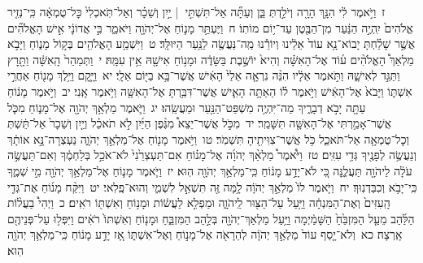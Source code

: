 \documentclass[18pt]{article}
\newcommand{\kri}[1]{\Afootnote{#1}}	%
\begin{document}
 {\loc ז~}וַיֹּ֣אמֶר לִ֔י הִנָּ֥ךְ הָרָ֖ה וְיֹלַ֣דְתְּ בֵּ֑ן וְעַתָּ֞ה אַל־תִּשְׁתִּ֣י  |  יַ֣יִן וְשֵׁכָ֗ר וְאַל־תֹּֽאכְלִי֙ כׇּל־טֻמְאָ֔ה כִּֽי־נְזִ֤יר אֱלֹהִים֙ יִֽהְיֶ֣ה הַנַּ֔עַר מִן־הַבֶּ֖טֶן עַד־י֥וֹם מוֹתֽוֹ׃ \startlock
 {\loc ח~}וַיֶּעְתַּ֥ר מָנ֛וֹחַ אֶל־יְהֹוָ֖ה וַיֹּאמַ֑ר בִּ֣י אֲדוֹנָ֔י אִ֣ישׁ הָאֱלֹהִ֞ים אֲשֶׁ֣ר שָׁלַ֗חְתָּ יָבוֹא־נָ֥א עוֹד֙ אֵלֵ֔ינוּ וְיוֹרֵ֕נוּ מַֽה־נַּעֲשֶׂ֖ה לַנַּ֥עַר הַיּוּלָּֽד׃ \startlock
 {\loc ט~}וַיִּשְׁמַ֥ע הָאֱלֹהִ֖ים בְּק֣וֹל מָנ֑וֹחַ וַיָּבֹ֣א מַלְאַךְ֩ הָאֱלֹהִ֨ים ע֜וֹד אֶל־הָאִשָּׁ֗ה וְהִיא֙ יוֹשֶׁ֣בֶת בַּשָּׂדֶ֔ה וּמָנ֥וֹחַ אִישָׁ֖הּ אֵ֥ין עִמָּֽהּ׃ \startlock
 {\loc י~}וַתְּמַהֵר֙ הָֽאִשָּׁ֔ה וַתָּ֖רׇץ וַתַּגֵּ֣ד לְאִישָׁ֑הּ וַתֹּ֣אמֶר אֵלָ֔יו הִנֵּ֨ה נִרְאָ֤ה אֵלַי֙ הָאִ֔ישׁ אֲשֶׁר־בָּ֥א בַיּ֖וֹם אֵלָֽי׃ \startlock
 {\loc יא~}וַיָּ֛קׇם וַיֵּ֥לֶךְ מָנ֖וֹחַ אַחֲרֵ֣י אִשְׁתּ֑וֹ וַיָּבֹא֙ אֶל־הָאִ֔ישׁ וַיֹּ֣אמֶר ל֗וֹ הַאַתָּ֥ה הָאִ֛ישׁ אֲשֶׁר־דִּבַּ֥רְתָּ אֶל־הָאִשָּׁ֖ה וַיֹּ֥אמֶר אָֽנִי׃ \startlock
 {\loc יב~}וַיֹּ֣אמֶר מָנ֔וֹחַ עַתָּ֖ה יָבֹ֣א דְבָרֶ֑יךָ מַה־יִּהְיֶ֥ה מִשְׁפַּט־הַנַּ֖עַר וּמַעֲשֵֽׂהוּ׃ \startlock
 {\loc יג~}וַיֹּ֛אמֶר מַלְאַ֥ךְ יְהֹוָ֖ה אֶל־מָנ֑וֹחַ מִכֹּ֛ל אֲשֶׁר־אָמַ֥רְתִּי אֶל־הָאִשָּׁ֖ה תִּשָּׁמֵֽר׃ \startlock
 {\loc יד~}מִכֹּ֣ל אֲשֶׁר־יֵצֵא֩ מִגֶּ֨פֶן הַיַּ֜יִן לֹ֣א תֹאכַ֗ל וְיַ֤יִן וְשֵׁכָר֙ אַל־תֵּ֔שְׁתְּ וְכׇל־טֻמְאָ֖ה אַל־תֹּאכַ֑ל כֹּ֥ל אֲשֶׁר־צִוִּיתִ֖יהָ תִּשְׁמֹֽר׃ \startlock
 {\loc טו~}וַיֹּ֥אמֶר מָנ֖וֹחַ אֶל־מַלְאַ֣ךְ יְהֹוָ֑ה נַעְצְרָה־נָּ֣א אוֹתָ֔ךְ וְנַעֲשֶׂ֥ה לְפָנֶ֖יךָ גְּדִ֥י עִזִּֽים׃ \startlock
 {\loc טז~}וַיֹּ֩אמֶר֩ מַלְאַ֨ךְ יְהֹוָ֜ה אֶל־מָנ֗וֹחַ אִם־תַּעְצְרֵ֙נִי֙ לֹא־אֹכַ֣ל בְּלַחְמֶ֔ךָ וְאִם־תַּעֲשֶׂ֣ה עֹלָ֔ה לַיהֹוָ֖ה תַּעֲלֶ֑נָּה כִּ֚י לֹא־יָדַ֣ע מָנ֔וֹחַ כִּֽי־מַלְאַ֥ךְ יְהֹוָ֖ה הֽוּא׃ \startlock
 {\loc יז~}וַיֹּ֧אמֶר מָנ֛וֹחַ אֶל־מַלְאַ֥ךְ יְהֹוָ֖ה מִ֣י שְׁמֶ֑ךָ כִּֽי־יָבֹ֥א  \edtext{(דבריך)}{\kri{קרי: דְבָרְךָ֖}}  וְכִבַּדְנֽוּךָ׃ \startlock
 {\loc יח~}וַיֹּ֤אמֶר לוֹ֙ מַלְאַ֣ךְ יְהֹוָ֔ה לָ֥מָּה זֶּ֖ה תִּשְׁאַ֣ל לִשְׁמִ֑י וְהוּא־פֶֽלִאי׃ \startlock
 {\loc יט~}וַיִּקַּ֨ח מָנ֜וֹחַ אֶת־גְּדִ֤י הָֽעִזִּים֙ וְאֶת־הַמִּנְחָ֔ה וַיַּ֥עַל עַל־הַצּ֖וּר לַֽיהֹוָ֑ה וּמַפְלִ֣א לַעֲשׂ֔וֹת וּמָנ֥וֹחַ וְאִשְׁתּ֖וֹ רֹאִֽים׃ \startlock
 {\loc כ~}וַיְהִי֩ בַעֲל֨וֹת הַלַּ֜הַב מֵעַ֤ל הַמִּזְבֵּ֙חַ֙ הַשָּׁמַ֔יְמָה וַיַּ֥עַל מַלְאַךְ־יְהֹוָ֖ה בְּלַ֣הַב הַמִּזְבֵּ֑חַ וּמָנ֤וֹחַ וְאִשְׁתּוֹ֙ רֹאִ֔ים וַיִּפְּל֥וּ עַל־פְּנֵיהֶ֖ם אָֽרְצָה׃ \startlock
 {\loc כא~}וְלֹא־יָ֤סַף עוֹד֙ מַלְאַ֣ךְ יְהֹוָ֔ה לְהֵרָאֹ֖ה אֶל־מָנ֣וֹחַ וְאֶל־אִשְׁתּ֑וֹ אָ֚ז יָדַ֣ע מָנ֔וֹחַ כִּֽי־מַלְאַ֥ךְ יְהֹוָ֖ה הֽוּא׃ \startlock
\end{document}
